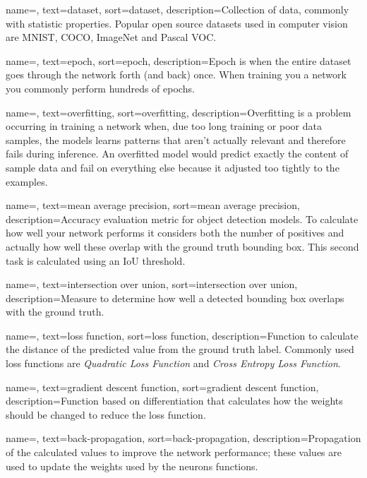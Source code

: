 {
	name=,
	text=dataset,
	sort=dataset,
	description={Collection of data, commonly with statistic properties. Popular open source datasets used in computer vision are MNIST, COCO, ImageNet and Pascal VOC.}
}

{
	name=,
	text=epoch,
	sort=epoch,
	description={Epoch is when the entire dataset goes through the network forth (and back) once. When training you a network you commonly perform hundreds of epochs.}
}

{
	name=,
	text=overfitting,
	sort=overfitting,
	description={Overfitting is a problem occurring in training a network when, due too long training or poor data samples, the models learns patterns that aren't actually relevant and therefore fails during inference. An overfitted model would predict exactly the content of sample data and fail on everything else because it adjusted too tightly to the examples.}
}

{
	name=,
	text=mean average precision,
	sort=mean average precision,
	description={Accuracy evaluation metric for object detection models. To calculate how well your network performs it considers both the number of positives and actually how well these overlap with the ground truth bounding box. This second task is calculated using an IoU threshold.}
}

{
	name=,
	text=intersection over union,
	sort=intersection over union,
	description={Measure to determine how well a detected bounding box overlaps with the ground truth.}
}

{
	name=,
	text=loss function,
	sort=loss function,
	description={Function to calculate the distance of the predicted value from the ground truth label. Commonly used loss functions are \emph{Quadratic Loss Function} and \emph{Cross Entropy Loss Function}.}
}

{
	name=,
	text=gradient descent function,
	sort=gradient descent function,
	description={Function based on differentiation that calculates how the weights should be changed to reduce the loss function.}
}

{
	name=,
	text=back-propagation,
	sort=back-propagation,
	description={Propagation of the calculated values to improve the network performance; these values are used to update the weights used by the neurons functions.}
}

